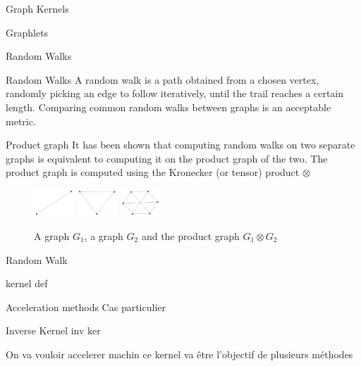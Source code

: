\documentclass[compress]{beamer}
\begin{document}
\begin{frame}{Graph Kernels}
    
\end{frame}
\begin{frame}{Graphlets}
    
\end{frame}
\begin{frame}{Random Walks}
\begin{block}{Random Walks}
	A random walk is a path obtained from a chosen vertex, randomly picking an edge to follow iteratively, until the trail reaches a certain length.
	Comparing common random walks between graphs is an acceptable metric.
\end{block}
\begin{block}{Product graph}
It has been shown\cite{imrich2000product} that computing random walks on two separate graphs is equivalent to computing it on the product graph of the two. The product graph is computed using the Kronecker (or tensor) product $\otimes$
\end{block}
\begin{figure}
\begin{multicols}{3}
\includegraphics[width=1.5cm]{data/prod_graph/g1.png}
\includegraphics[width=1.5cm]{data/prod_graph/g2.png}
\includegraphics[width=1.5cm]{data/prod_graph/gx.png}
\end{multicols}
\caption{A graph $G_1$, a graph $G_2$ and the product graph $G_1 \otimes G_2$}
\end{figure}
\end{frame}
\begin{frame}{Random Walk}
	\begin{definition}
		kernel def
	\end{definition}
\end{frame}
\begin{frame}{Acceleration methods}
Cas particulier
\begin{block}{Inverse Kernel}
	inv ker 
\end{block}
On va vouloir accelerer machin
ce kernel va être l'objectif de plusieurs méthodes
\end{frame}
\end{document}
